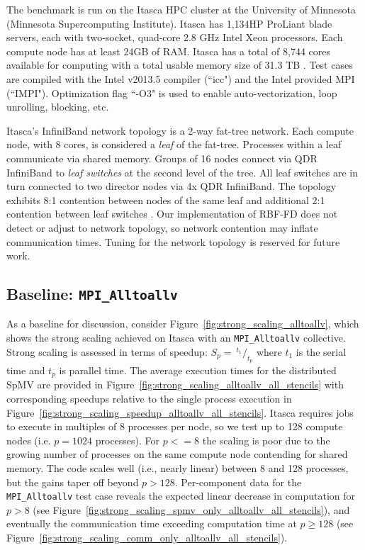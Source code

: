 \documentclass{report}
\begin{document}
The benchmark is run on the Itasca HPC cluster at the University of Minnesota (Minnesota Supercomputing Institute). Itasca has 1,134HP ProLiant blade servers, each with two-socket, quad-core 2.8 GHz Intel Xeon processors. Each compute node has at least 24GB of RAM. Itasca has a total of 8,744 cores available for computing with a total usable memory size of 31.3 TB \cite{MSIItasca}. Test cases are compiled with the Intel v2013.5 compiler (``icc") and the Intel provided MPI (``IMPI"). Optimization flag ``-O3" is used to enable auto-vectorization, loop unrolling, blocking, etc.

Itasca's InfiniBand network topology is a 2-way fat-tree network. Each compute node, with 8 cores, is considered a \emph{leaf} of the fat-tree. Processes within a leaf communicate via shared memory. Groups of 16 nodes connect via QDR InfiniBand to \emph{leaf switches} at the second level of the tree. All leaf switches are in turn connected to two director nodes via 4x QDR InfiniBand. The topology exhibits 8:1 contention between nodes of the same leaf and additional 2:1 contention between leaf switches \cite{ItascaTuning}. Our implementation of RBF-FD does not detect or adjust to network topology, so network contention may inflate communication times. Tuning for the network topology is reserved for future work. 



\subsection{Baseline: \texttt{MPI\_Alltoallv}}

As a baseline for discussion, consider Figure~\ref{fig:strong_scaling_alltoallv}, which shows the strong scaling achieved on Itasca with an \texttt{MPI\_Alltoallv} collective. Strong scaling is assessed in terms of speedup: $S_p = \ ^{t_1}/_{t_p}$ where $t_1$ is the serial time and $t_p$ is parallel time. The average execution times for the distributed SpMV are provided in Figure~\ref{fig:strong_scaling_alltoallv_all_stencils} with corresponding speedups relative to the single process execution in Figure~\ref{fig:strong_scaling_speedup_alltoallv_all_stencils}. Itasca requires jobs to execute in multiples of 8 processes per node, so we test up to 128 compute nodes (i.e. $p=1024$ processes). For $p <= 8$ the scaling is poor due to the growing number of processes on the same compute node contending for shared memory. The code scales well (i.e., nearly linear) between 8 and 128 processes, but the gains taper off beyond $p > 128$. Per-component data for the \texttt{MPI\_Alltoallv} test case reveals the expected linear decrease in computation for $p>8$ (see Figure~\ref{fig:strong_scaling_spmv_only_alltoallv_all_stencils}), and eventually the communication time exceeding computation time at $p \geq 128$ (see Figure~\ref{fig:strong_scaling_comm_only_alltoallv_all_stencils}). 
\end{document}
